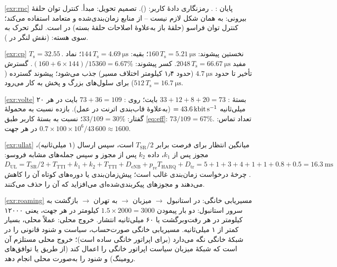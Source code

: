 \documentclass[11pt,a4paper]{article}
\begin{document}
\begin{solutionbox}{\ref{exr:rnc}}
پایان : . رمزنگاری دادهٔ کاربر:  (). تصمیم تحویل:  مبدأ.
کنترل توان حلقهٔ بیرونی: به همان شکل لازم نیست --  از منابع زمان‌بندی‌شده و متعامد استفاده
می‌کند؛ کنترل توان فراسو (حلقهٔ باز به‌علاوهٔ اصلاحات حلقهٔ بسته) در  است. لنگر تحرک به سوی هسته:
 (نقش لنگر  در ).
\end{solutionbox}

\begin{solutionbox}{\ref{exr:cp}}
$T_\mathrm{s} = 32.55$\,. نخستین پیشوند: $160\,T_\mathrm{s} = \qty{5.21}{\micro\second}$؛ بقیه:
$144\,T_\mathrm{s} = \qty{4.69}{\micro\second}$؛ نماد مفید $2048\,T_\mathrm{s} = \qty{66.67}{\micro\second}$.
کسر پیشوند: $(160+6\times144)/15360 = 6.67\%$. گسترش تأخیر تا حدود $\qty{4.7}{\micro\second}$ (حدود ۱٫۴
کیلومتر اختلاف مسیر) جذب می‌شود؛ پیشوند گسترده ($512\,T_\mathrm{s} = \qty{16.7}{\micro\second}$) برای
سلول‌های بزرگ و پخش به کار می‌رود.
\end{solutionbox}

\begin{solutionbox}{\ref{exr:volte}}
بستهٔ : $33+12+8+20 = 73$ بایت؛ روی : $73+36 = 109$ بایت در هر ۲۰ میلی‌ثانیه
$= \qty{43.6}{\kilo\bit\per\second}$ (به‌علاوهٔ قاب‌بندی اترنت در عمل). بازده نسبت به محمولهٔ گفتار:
$33/109 = 30\%$؛ نسبت به بستهٔ  کاربر طبق \cref{eq:eff}: $73/109 = 67\%$. تعداد تماس:
$0.7\times100\times10^6/43\,600 \approx 1600$ در هر جهت.
\end{solutionbox}

\begin{solutionbox}{\ref{exr:ullat}}
میانگین انتظار برای فرصت  برابر $T_{\mathrm{SR}}/2$ است، سپس ارسال  (۱ میلی‌ثانیه)، مجوز پس
از $k_1$، داده $k_2$ پس از مجوز و سپس جمله‌های مشابه فروسو:
$D_{\mathrm{UL}} = T_{\mathrm{SR}}/2 + T_{\mathrm{TTI}} + k_1 + k_2 + T_{\mathrm{TTI}} + D_{\mathrm{eNB}} +
p_{\mathrm{re}}T_{\mathrm{HARQ}} + D_{\mathrm{tr}} = 5 + 1 + 3 + 4 + 1 + 1 + 0.8 + 0.5 = \qty{16.3}{\milli\second}$.
چرخهٔ درخواست زمان‌بندی غالب است؛ پیش‌زمان‌بندی یا دوره‌های کوتاه  آن را کاهش می‌دهند و 
مجوزهای پیکربندی‌شده‌ای می‌افزاید که آن را حذف می‌کنند.
\end{solutionbox}

\begin{solutionbox}{\ref{exr:roaming}}
مسیریابی خانگی:  در استانبول $\to$  میزبان $\to$  به  تهران $\to$ بازگشت
به سرور استانبول: دو بار پیمودن $1.5\times2000 = 3000$ کیلومتر در هر جهت، یعنی ۱۲۰۰۰ کیلومتر در هر
رفت‌وبرگشت یا ۶۰ میلی‌ثانیه انتشار. خروج محلی: عملاً محلی، بسیار کمتر از ۱ میلی‌ثانیه. مسیریابی خانگی
صورت‌حساب، سیاست و شنود قانونی را در شبکهٔ خانگی نگه می‌دارد (برای اپراتور خانگی ساده است)؛ خروج محلی
مستلزم آن است که شبکهٔ میزبان سیاست اپراتور خانگی را اعمال کند (از طریق  یا توافق‌های رومینگ)
و شنود را به‌صورت محلی انجام دهد.
\end{solutionbox}
\end{document}

